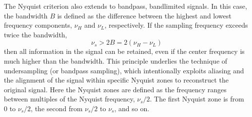 The Nyquist criterion also extends to bandpass, bandlimited signals. In this case, the bandwidth $B$ is defined as the difference between the highest and lowest frequency components, $\nu_H$ and $\nu_L$, respectively. If the sampling frequency exceeds twice the bandwidth,
\begin{equation}
	\nu_s > 2B = 2(\nu_H - \nu_L)
\end{equation}
then all information in the signal can be retained, even if the center frequency is much higher than the bandwidth. This principle underlies the technique of undersampling (or bandpass sampling), which intentionally exploits aliasing and the alignment of the signal within specific Nyquist zones to reconstruct the original signal. Here the Nyquist zones are defined as the frequency ranges between multiples of the Nyquist frequency, $\nu_s/2$. The first Nyquist zone is from 0 to $\nu_s/2$, the second from $\nu_s/2$ to $\nu_s$, and so on.


